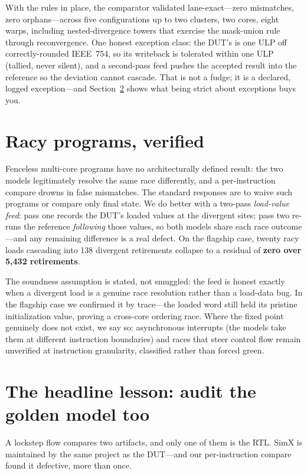 \documentclass[conference]{IEEEtran}
\newcommand{\code}[1]{\texttt{\detokenize{#1}}}
\begin{document}
With the rules in place, the comparator validated lane-exact---zero
mismatches, zero orphans---across five configurations up to two
clusters, two cores, eight warps, including nested-divergence towers
that exercise the mask-union rule through reconvergence. One honest
exception class: the DUT's \code{fsqrt.s} is one ULP off
correctly-rounded IEEE~754, so its writeback is tolerated within one
ULP (tallied, never silent), and a second-pass feed pushes the
accepted result into the reference so the deviation cannot cascade.
That is not a fudge; it is a declared, logged exception---and
Section~\ref{sec:golden} shows what being strict about exceptions
buys you.

\section{Racy programs, verified}
Fenceless multi-core programs have no architecturally defined result:
the two models legitimately resolve the same race differently, and a
per-instruction compare drowns in false mismatches. The standard
responses are to waive such programs or compare only final state. We
do better with a two-pass \emph{load-value feed}: pass one records
the DUT's loaded values at the divergent sites; pass two re-runs the
reference \emph{following} those values, so both models share each
race outcome---and any remaining difference is a real defect. On the
flagship case, twenty racy loads cascading into 138 divergent
retirements collapse to a residual of \textbf{zero over 5{,}432
	retirements}.

The soundness assumption is stated, not smuggled: the feed is honest
exactly when a divergent load is a genuine race resolution rather
than a load-data bug. In the flagship case we confirmed it by
trace---the loaded word still held its pristine initialization value,
proving a cross-core ordering race. Where the fixed point genuinely
does not exist, we say so: asynchronous interrupts (the models take
them at different instruction boundaries) and races that steer
control flow remain unverified at instruction granularity, classified
rather than forced green.

\section{The headline lesson: audit the golden model too}
\label{sec:golden}
A lockstep flow compares two artifacts, and only one of them is the
RTL. SimX is maintained by the same project as the DUT---and our
per-instruction compare found it defective, more than once.
\end{document}
